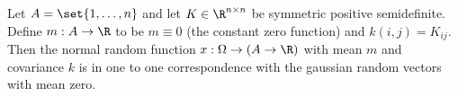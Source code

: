 
Let $A = \set{1, \dots, n}$ and let $K \in \R^{n \times n}$ be symmetric positive semidefinite.
Define $m: A \to \R$ to be $m \equiv 0$ (the constant zero function) and $k(i, j) = K_{ij}$.
Then the normal random function $x: \Omega \to (A \to \R)$ with mean $m$ and covariance $k$ is in one to one correspondence with the gaussian random vectors with mean zero.

%

%
%
